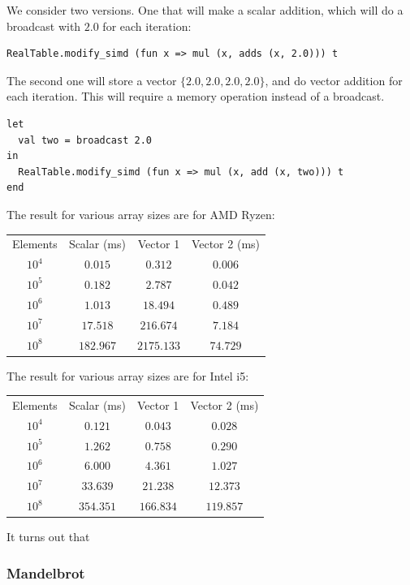 \documentclass{article}
\begin{document}
We consider two versions. One that will make a scalar addition, which will do a broadcast with $2.0$ for each iteration:
\begin{lstlisting}
RealTable.modify_simd (fun x => mul (x, adds (x, 2.0))) t
\end{lstlisting}
The second one will store a vector $\{ 2.0, 2.0, 2.0, 2.0 \}$, and do vector addition for each iteration. This will require a memory operation instead of a broadcast.
\begin{lstlisting}
let
  val two = broadcast 2.0
in
  RealTable.modify_simd (fun x => mul (x, add (x, two))) t
end
\end{lstlisting}
The result for various array sizes are for AMD Ryzen:
\begin{center}
\begin{tabular}{ c c c c }
    Elements & Scalar (ms) & Vector 1 & Vector 2 (ms) \\
    $10^4$ & $0.015$ & $0.312$ & $0.006$ \\
    $10^5$ & $0.182$ & $2.787$ & $0.042$ \\
    $10^6$ & $1.013$ & $18.494$ & $0.489$ \\
    $10^7$ & $17.518$ & $216.674$ & $7.184$ \\
    $10^8$ & $182.967$ & $2175.133$ & $74.729$ \\
\end{tabular}
\end{center}

The result for various array sizes are for Intel i5:
\begin{center}
\begin{tabular}{ c c c c }
    Elements & Scalar (ms) & Vector 1 & Vector 2 (ms) \\
    $10^4$ & $0.121$ & $0.043$ & $0.028$ \\
    $10^5$ & $1.262$ & $0.758$ & $0.290$ \\
    $10^6$ & $6.000$ & $4.361$ & $1.027$ \\
    $10^7$ & $33.639$ & $21.238$ & $12.373$ \\
    $10^8$ & $354.351$ & $166.834$ & $119.857$ \\
\end{tabular}
\end{center}

It turns out that 

\subsubsection{Mandelbrot}
\end{document}
